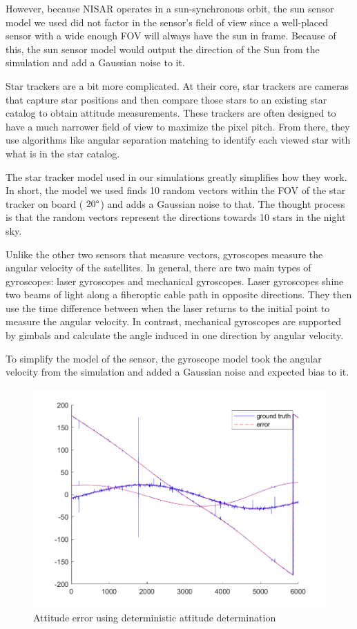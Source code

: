 However, because NISAR operates in a sun-synchronous orbit, the sun sensor model we used did not factor in the sensor's field of view since a well-placed sensor with a wide enough FOV will always have the sun in frame. Because of this, the sun sensor model would output the direction of the Sun from the simulation and add a Gaussian noise to it.

Star trackers are a bit more complicated. At their core, star trackers are cameras that capture star positions and then compare those stars to an existing star catalog to obtain attitude measurements. These trackers are often designed to have a much narrower field of view to maximize the pixel pitch. From there, they use algorithms like angular separation matching to identify each viewed star with what is in the star catalog.

The star tracker model used in our simulations greatly simplifies how they work. In short, the model we used finds 10 random vectors within the FOV of the star tracker on board ($~20 \degree$) and adds a Gaussian noise to that. The thought process is that the random vectors represent the directions towards 10 stars in the night sky.

Unlike the other two sensors that measure vectors, gyroscopes measure the angular velocity of the satellites. In general, there are two main types of gyroscopes: laser gyroscopes and mechanical gyroscopes. Laser gyroscopes shine two beams of light along a fiberoptic cable path in opposite directions. They then use the time difference between when the laser returns to the initial point to measure the angular velocity. In contrast, mechanical gyroscopes are supported by gimbals and calculate the angle induced in one direction by angular velocity.

To simplify the model of the sensor, the gyroscope model took the angular velocity from the simulation and added a Gaussian noise and expected bias to it.

\begin{figure}[H]
\centering
\includegraphics[scale=0.6]{Images/ps7_problem4_DADFict.png}
\caption{Attitude error using deterministic attitude determination}
\label{fig:ps7_problem4_DADFict}
\end{figure}

